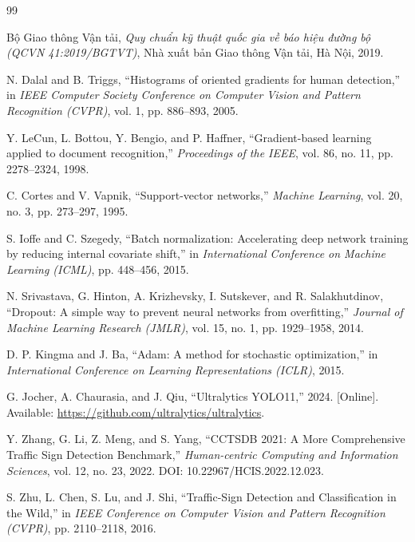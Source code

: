 ﻿\newpage
\renewcommand{\refname}{Tài liệu tham khảo}
\begin{thebibliography}{99}

 Bộ Giao thông Vận tải, \emph{Quy chuẩn kỹ thuật quốc gia về báo hiệu đường bộ (QCVN 41:2019/BGTVT)}, Nhà xuất bản Giao thông Vận tải, Hà Nội, 2019.

 N. Dalal and B. Triggs, ``Histograms of oriented gradients for human detection,'' in \emph{IEEE Computer Society Conference on Computer Vision and Pattern Recognition (CVPR)}, vol. 1, pp. 886--893, 2005.

 Y. LeCun, L. Bottou, Y. Bengio, and P. Haffner, ``Gradient-based learning applied to document recognition,'' \emph{Proceedings of the IEEE}, vol. 86, no. 11, pp. 2278--2324, 1998.

 C. Cortes and V. Vapnik, ``Support-vector networks,'' \emph{Machine Learning}, vol. 20, no. 3, pp. 273--297, 1995.

 S. Ioffe and C. Szegedy, ``Batch normalization: Accelerating deep network training by reducing internal covariate shift,'' in \emph{International Conference on Machine Learning (ICML)}, pp. 448--456, 2015.

 N. Srivastava, G. Hinton, A. Krizhevsky, I. Sutskever, and R. Salakhutdinov, ``Dropout: A simple way to prevent neural networks from overfitting,'' \emph{Journal of Machine Learning Research (JMLR)}, vol. 15, no. 1, pp. 1929--1958, 2014.

 D. P. Kingma and J. Ba, ``Adam: A method for stochastic optimization,'' in \emph{International Conference on Learning Representations (ICLR)}, 2015.

 G. Jocher, A. Chaurasia, and J. Qiu, ``Ultralytics YOLO11,'' 2024. [Online]. Available: \url{https://github.com/ultralytics/ultralytics}.

 Y. Zhang, G. Li, Z. Meng, and S. Yang, ``CCTSDB 2021: A More Comprehensive Traffic Sign Detection Benchmark,'' \emph{Human-centric Computing and Information Sciences}, vol. 12, no. 23, 2022. DOI: 10.22967/HCIS.2022.12.023.

 S. Zhu, L. Chen, S. Lu, and J. Shi, ``Traffic-Sign Detection and Classification in the Wild,'' in \emph{IEEE Conference on Computer Vision and Pattern Recognition (CVPR)}, pp. 2110--2118, 2016.

\end{thebibliography}
